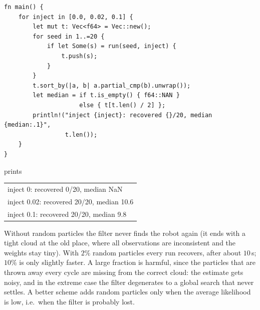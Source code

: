\begin{enumerate}[label=\textbf{\ansnum.\arabic*}]
\begin{verbatim}
fn main() {
    for inject in [0.0, 0.02, 0.1] {
        let mut t: Vec<f64> = Vec::new();
        for seed in 1..=20 {
            if let Some(s) = run(seed, inject) {
                t.push(s);
            }
        }
        t.sort_by(|a, b| a.partial_cmp(b).unwrap());
        let median = if t.is_empty() { f64::NAN }
                     else { t[t.len() / 2] };
        println!("inject {inject}: recovered {}/20, median {median:.1}",
                 t.len());
    }
}
\end{verbatim}
prints
\begin{center}\small\ttfamily
\begin{tabular}{@{}l@{}}
inject 0: recovered 0/20, median NaN\\
inject 0.02: recovered 20/20, median 10.6\\
inject 0.1: recovered 20/20, median 9.8
\end{tabular}
\end{center}
Without random particles the filter never finds the robot again (it ends with a tight cloud at the old place, where all observations are inconsistent and the weights stay tiny). With $2\%$ random particles every run recovers, after about $10$\,s; $10\%$ is only slightly faster. A large fraction is harmful, since the particles that are thrown away every cycle are missing from the correct cloud: the estimate gets noisy, and in the extreme case the filter degenerates to a global search that never settles. A better scheme adds random particles only when the average likelihood is low, i.e.\ when the filter is probably lost.
\end{enumerate}
